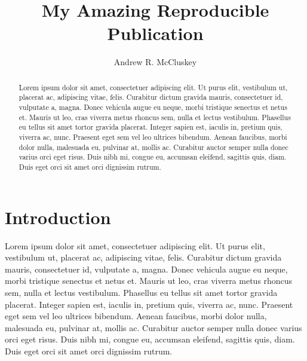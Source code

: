 \documentclass[reprint,superscriptaddress,nobibnotes,amsmath,amssymb,aps,hidelinks]{revtex4-2}
\begin{document}
\title{My Amazing Reproducible Publication}

\author{Andrew R. McCluskey}

\begin{abstract}
    Lorem ipsum dolor sit amet, consectetuer adipiscing elit.
    Ut purus elit, vestibulum ut, placerat ac, adipiscing vitae, felis.
    Curabitur dictum gravida mauris, consectetuer id, vulputate a, magna.
    Donec vehicula augue eu neque, morbi tristique senectus et netus et.
    Mauris ut leo, cras viverra metus rhoncus sem, nulla et lectus vestibulum.
    Phasellus eu tellus sit amet tortor gravida placerat.
    Integer sapien est, iaculis in, pretium quis, viverra ac, nunc.
    Praesent eget sem vel leo ultrices bibendum.
    Aenean faucibus, morbi dolor nulla, malesuada eu, pulvinar at, mollis ac.
    Curabitur auctor semper nulla donec varius orci eget risus.
    Duis nibh mi, congue eu, accumsan eleifend, sagittis quis, diam.
    Duis eget orci sit amet orci dignissim rutrum.
\end{abstract}

\maketitle

\section{Introduction}
\label{sec:intro}

Lorem ipsum dolor sit amet, consectetuer adipiscing elit.
Ut purus elit, vestibulum ut, placerat ac, adipiscing vitae, felis.
Curabitur dictum gravida mauris, consectetuer id, vulputate a, magna.
Donec vehicula augue eu neque, morbi tristique senectus et netus et.
Mauris ut leo, cras viverra metus rhoncus sem, nulla et lectus vestibulum.
Phasellus eu tellus sit amet tortor gravida placerat.
Integer sapien est, iaculis in, pretium quis, viverra ac, nunc.
Praesent eget sem vel leo ultrices bibendum.
Aenean faucibus, morbi dolor nulla, malesuada eu, pulvinar at, mollis ac.
Curabitur auctor semper nulla donec varius orci eget risus.
Duis nibh mi, congue eu, accumsan eleifend, sagittis quis, diam.
Duis eget orci sit amet orci dignissim rutrum.
\end{document}
